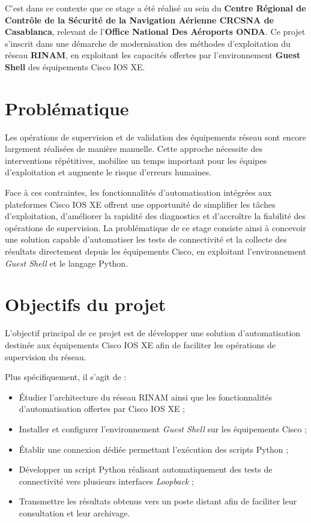 \documentclass[12pt, a4paper, oneside]{report}
\begin{document}
C'est dans ce contexte que ce stage a été réalisé au sein du 
\textbf{Centre Régional de Contrôle de la Sécurité de la Navigation Aérienne \ac{CRCSNA} de Casablanca}, 
relevant de l'\textbf{Office National Des Aéroports \ac{ONDA}}. 
Ce projet s'inscrit dans une démarche de modernisation des méthodes 
d'exploitation du réseau \textbf{RINAM}, en exploitant les capacités 
offertes par l'environnement \textbf{Guest Shell} des équipements Cisco IOS XE.

\section*{Problématique}

Les opérations de supervision et de validation des équipements réseau sont encore 
largement réalisées de manière manuelle. Cette approche nécessite des interventions 
répétitives, mobilise un temps important pour les équipes d'exploitation et augmente 
le risque d'erreurs humaines.

Face à ces contraintes, les fonctionnalités d'automatisation intégrées aux plateformes 
Cisco IOS XE offrent une opportunité de simplifier les tâches d'exploitation, 
d'améliorer la rapidité des diagnostics et d'accroître la fiabilité des opérations de supervision. 
La problématique de ce stage consiste ainsi à concevoir une solution capable d'automatiser 
les tests de connectivité et la collecte des résultats directement depuis les équipements Cisco, 
en exploitant l'environnement \textit{Guest Shell} et le langage Python.

\section*{Objectifs du projet}

L'objectif principal de ce projet est de développer une solution d'automatisation 
destinée aux équipements Cisco IOS XE afin de faciliter les opérations de supervision du réseau.

Plus spécifiquement, il s'agit de :

\begin{itemize}
    \item Étudier l'architecture du réseau RINAM ainsi que les fonctionnalités d'automatisation offertes par Cisco IOS XE ;
    \item Installer et configurer l'environnement \textit{Guest Shell} sur les équipements Cisco ;
    \item Établir une connexion dédiée permettant l'exécution des scripts Python ;
    \item Développer un script Python réalisant automatiquement des tests de connectivité vers plusieurs interfaces \textit{Loopback} ;
    \item Transmettre les résultats obtenus vers un poste distant afin de faciliter leur consultation et leur archivage.
\end{itemize}
\end{document}
